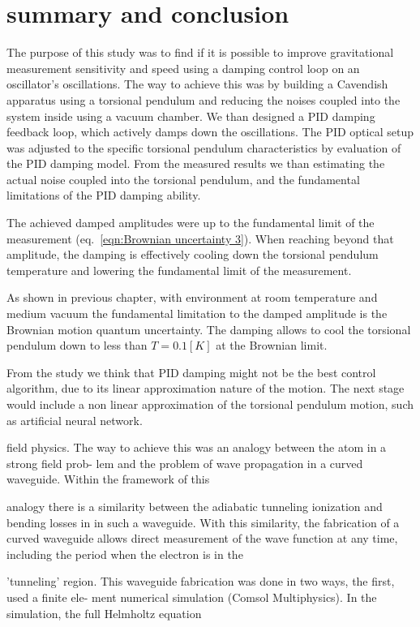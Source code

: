 \documentclass[\main/master.tex]{subfiles}
\begin{document}
\chapter{summary and conclusion}\label{chp:summary and conclusion}
The purpose of this study was to find if it is possible to improve gravitational measurement sensitivity and speed using a damping control loop on an oscillator's oscillations. The way to achieve this was by building a Cavendish apparatus using a torsional pendulum and reducing the noises coupled into the system inside using a vacuum chamber. We than designed a PID damping feedback loop, which actively damps down the oscillations. The PID optical setup was adjusted to the specific torsional pendulum characteristics by evaluation of the PID damping model. From the measured results we than estimating the actual noise coupled into the torsional pendulum, and the fundamental limitations of the PID damping ability.
\par\noindent
The achieved damped amplitudes were up to the fundamental limit of the measurement (eq.~\ref{eqn:Brownian uncertainty 3}). When reaching beyond that amplitude, the damping is effectively cooling down the torsional pendulum temperature and lowering the fundamental limit of the measurement. 
\par\noindent
As shown in previous chapter, with environment at room temperature and medium vacuum the fundamental limitation to the damped amplitude is the Brownian motion quantum uncertainty. The damping allows to cool the torsional pendulum down to less than $T=0.1[K]$ at the Brownian limit.
\par\noindent
From the study we think that PID damping might not be the best control algorithm, due to its linear approximation nature of the motion. The next stage would include a non linear approximation of the torsional pendulum motion, such as artificial neural network. 
\par\noindent


field physics. The way to achieve this was an analogy between the atom in a strong field prob-
lem and the problem of wave propagation in a curved waveguide. Within the framework of this

analogy there is a similarity between the adiabatic tunneling ionization and bending losses in
in such a waveguide. With this similarity, the fabrication of a curved waveguide allows direct
measurement of the wave function at any time, including the period when the electron is in the

’tunneling’ region. This waveguide fabrication was done in two ways, the first, used a finite ele-
ment numerical simulation (Comsol Multiphysics). In the simulation, the full Helmholtz equation
\end{document}
